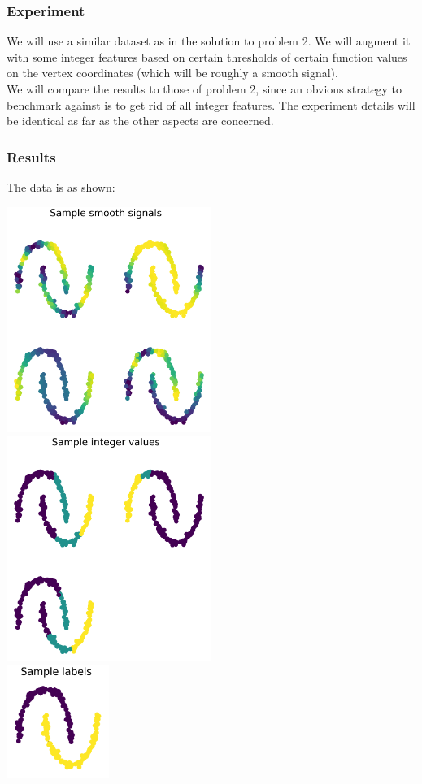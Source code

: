 \documentclass[a4paper]{article}
\newcommand{\nl}{\vspace{0.2cm}\\}
\begin{document}
\subsubsection{Experiment}

We will use a similar dataset as in the solution to problem 2. We will augment it with some integer features based on certain thresholds of certain function values on the vertex coordinates
(which will be roughly a smooth signal).\nl

We will compare the results to those of problem 2, since an obvious strategy to benchmark against is to get rid of all integer features. The experiment details will be identical as far as the
other aspects are concerned.\nl

\subsubsection{Results}
The data is as shown:\nl
\begin{center}
    \includegraphics[width=0.5\textwidth]{images/p4/smooth_signals.png}\nl
    \includegraphics[width=0.5\textwidth]{images/p4/integer_values.png}\nl
    \includegraphics[width=0.25\textwidth]{images/p4/labels.png}\nl
\end{center}
\end{document}
